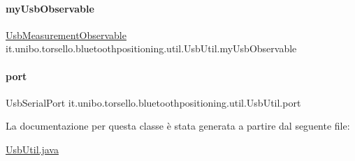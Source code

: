 \paragraph{\texorpdfstring{my\+Usb\+Observable}{myUsbObservable}}
{\footnotesize\ttfamily \hyperlink{classit_1_1unibo_1_1torsello_1_1bluetoothpositioning_1_1observables_1_1UsbMeasurementObservable}{Usb\+Measurement\+Observable} it.\+unibo.\+torsello.\+bluetoothpositioning.\+util.\+Usb\+Util.\+my\+Usb\+Observable\hspace{0.3cm}{\ttfamily [private]}}

\hypertarget{classit_1_1unibo_1_1torsello_1_1bluetoothpositioning_1_1util_1_1UsbUtil_a49aef08510b6d48d627670d834099c36_a49aef08510b6d48d627670d834099c36}{}\label{classit_1_1unibo_1_1torsello_1_1bluetoothpositioning_1_1util_1_1UsbUtil_a49aef08510b6d48d627670d834099c36_a49aef08510b6d48d627670d834099c36} 
\paragraph{\texorpdfstring{port}{port}}
{\footnotesize\ttfamily Usb\+Serial\+Port it.\+unibo.\+torsello.\+bluetoothpositioning.\+util.\+Usb\+Util.\+port\hspace{0.3cm}{\ttfamily [private]}}



La documentazione per questa classe è stata generata a partire dal seguente file\+:\begin{DoxyCompactItemize}
\item 
\hyperlink{UsbUtil_8java}{Usb\+Util.\+java}\end{DoxyCompactItemize}
